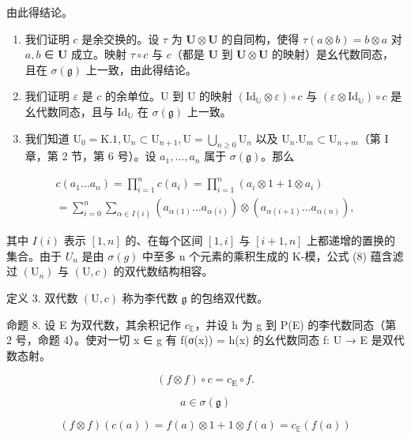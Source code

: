 由此得结论。

\begin{enumerate}
\def\labelenumi{(\alph{enumi})}
\setcounter{enumi}{2}
\item
  我们证明 \(c\) 是余交换的。设 \(\tau\) 为 \(\mathbf{U} \otimes \mathbf{U}\) 的自同构，使得 \(\tau(a \otimes b) = b \otimes a\) 对 \(a, b\) ∈ \(\mathbf{U}\) 成立。映射 \(\tau \circ c\) 与 \(c\)（都是 \(\mathbf{U}\) 到 \(\mathbf{U} \otimes \mathbf{U}\) 的映射）是幺代数同态，且在 \(\sigma(\mathfrak{g})\) 上一致，由此得结论。
\item
  我们证明 \(\varepsilon\) 是 \(c\) 的余单位。U 到 U 的映射 \((\mathrm{Id}_{\mathbb{U}} \otimes \varepsilon) \circ c\) 与 \((\varepsilon \otimes \mathrm{Id}_{\mathbb{U}}) \circ c\) 是幺代数同态，且与 \(\mathrm{Id}_{\mathbb{U}}\) 在 \(\sigma(\mathfrak{g})\) 上一致。
\item
  我们知道 \(\mathrm{U}_0 = \mathrm{K}.1, \mathrm{U}_n \subset \mathrm{U}_{n+1}, \mathrm{U} = \bigcup_{n \geqslant 0} \mathrm{U}_n\) 以及 \(\mathrm{U}_n. \mathrm{U}_m \subset \mathrm{U}_{n+m}\)（第 I 章，第 2 节，第 6 号）。设 \(a_1, \ldots, a_n\) 属于 \(\sigma(\mathfrak{g})\)。那么
\end{enumerate}

\[
\begin{array}{l} c (a _ {1} \ldots a _ {n}) = \prod_ {i = 1} ^ {n} c (a _ {i}) = \prod_ {i = 1} ^ {n} (a _ {i} \otimes 1 + 1 \otimes a _ {i}) \\ = \sum_ {i = 0} ^ {n} \sum_ {\alpha \in I (i)} (a _ {\alpha (1)} \ldots a _ {\alpha (i)}) \otimes (a _ {\alpha (i + 1)} \ldots a _ {\alpha (n)}), \end{array}\tag{8}
\]

其中 \(I(i)\) 表示 \([1, n]\) 的、在每个区间 \([1, i]\) 与 \([i + 1, n]\) 上都递增的置换的集合。由于 \(U_{n}\) 是由 \(\sigma(g)\) 中至多 n 个元素的乘积生成的 K-模，公式 (8) 蕴含滤过 \((\mathrm{U}_{n})\) 与 \((\mathrm{U}, c)\) 的双代数结构相容。

定义 3. 双代数 \((\mathrm{U}, c)\) 称为李代数 \(\mathfrak{g}\) 的包络双代数。

命题 8. 设 E 为双代数，其余积记作 \(c_{\mathbb{E}}\)，并设 h 为 g 到 P(E) 的李代数同态（第 2 号，命题 4）。使对一切 x ∈ g 有 f(σ(x)) = h(x) 的幺代数同态 f: U → E 是双代数态射。

\[
(f \otimes f) \circ c = c _ {\mathrm{E}} \circ f.
\]

\[
a \in \sigma (\mathfrak {g})
\]

\[
(f \otimes f) (c (a)) = f (a) \otimes 1 + 1 \otimes f (a) = c _ {\mathbb {E}} (f (a))
\]

